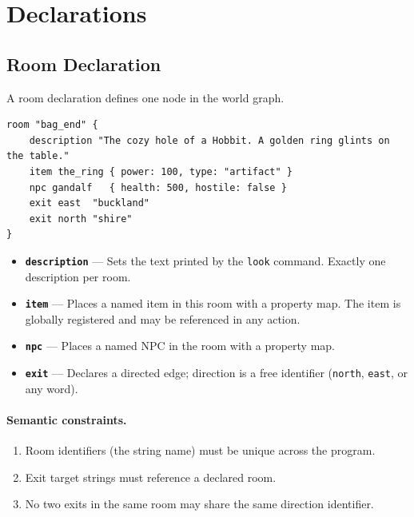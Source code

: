 \documentclass[12pt, a4paper]{article}
\begin{document}
\section{Declarations}

\subsection{Room Declaration}

A room declaration defines one node in the world graph.

\begin{lstlisting}[style=dc, caption={Room declaration syntax}]
room "bag_end" {
    description "The cozy hole of a Hobbit. A golden ring glints on the table."
    item the_ring { power: 100, type: "artifact" }
    npc gandalf   { health: 500, hostile: false }
    exit east  "buckland"
    exit north "shire"
}
\end{lstlisting}

\begin{itemize}
  \item \textbf{\texttt{description}} — Sets the text printed by the \texttt{look} command.
        Exactly one description per room.
  \item \textbf{\texttt{item}} — Places a named item in this room with a property map.
        The item is globally registered and may be referenced in any action.
  \item \textbf{\texttt{npc}} — Places a named NPC in the room with a property map.
  \item \textbf{\texttt{exit}} — Declares a directed edge; direction is a free identifier
        (\texttt{north}, \texttt{east}, or any word).
\end{itemize}

\paragraph{Semantic constraints.}
\begin{enumerate}
  \item Room identifiers (the string name) must be unique across the program.
  \item Exit target strings must reference a declared room.
  \item No two exits in the same room may share the same direction identifier.
\end{enumerate}
\end{document}
